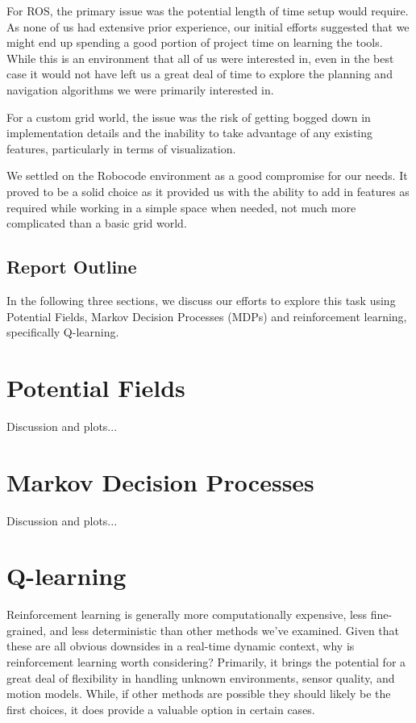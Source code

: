 \documentclass{aiaa-tc}%
\begin{document}
For ROS, the primary issue was the potential length of time setup
would require. As none of us had extensive prior experience, our
initial efforts suggested that we might end up spending a good portion
of project time on learning the tools. While this is an environment that all
of us were interested in, even in the best case it would not have left
us a great deal of time to explore the planning and navigation
algorithms we were primarily interested in.

For a custom grid world, the issue was the risk of getting bogged down
in implementation details and the inability to take advantage of any
existing features, particularly in terms of visualization.

We settled on the Robocode environment as a good compromise for our
needs. It proved to be a solid choice as it provided us with the
ability to add in features as required while working in a simple
space when needed, not much more complicated than a basic grid world.


\subsection{Report Outline}
In the following three sections, we discuss our efforts to explore
this task using Potential Fields, Markov Decision Processes (MDPs) and
reinforcement learning, specifically Q-learning.

\section{Potential Fields}
\label{Potential Fields}
Discussion and plots...

\section{Markov Decision Processes}
\label{Markov Decision Processes}
Discussion and plots...

\section{Q-learning}
\label{Q-learning}

Reinforcement learning is generally more computationally expensive,
less fine-grained, and less deterministic than other methods we've
examined. Given that these are all obvious downsides in a
real-time dynamic context, why is reinforcement learning worth
considering? Primarily, it brings the potential for a great deal of
flexibility in handling unknown environments, sensor quality, and
motion models. While, if other methods are possible they should likely
be the first choices, it does provide a valuable option in certain
cases.
\end{document}
